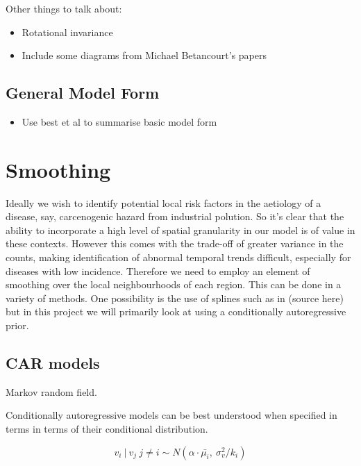 \documentclass{report}
\begin{document}
Other things to talk about:
\begin{itemize}

\item Rotational invariance

\item Include some diagrams from Michael Betancourt's papers

\end{itemize}

\subsection{General Model Form}

\begin{itemize}
\item Use best et al to summarise basic model form
\end{itemize}

\section{Smoothing}

Ideally we wish to identify potential local risk factors in the aetiology of a disease, say, carcenogenic hazard from industrial polution. So it's clear that the ability to incorporate a high level of spatial granularity in our model is of value in these contexts. However this comes with the trade-off of greater variance in the counts, making identification of abnormal temporal trends difficult, especially for diseases with low incidence. Therefore we need to employ an element of smoothing over the local neighbourhoods of each region. This can be done in a variety of methods. One possibility is the use of splines such as in (source here) but in this project we will primarily look at using a conditionally autoregressive prior.

\subsection{CAR models} \label{carmodel}

Markov random field.

Conditionally autoregressive models can be best understood when specified in terms in terms of their conditional distribution. 

\begin{equation}
v_i \ | \ v_j \ j \neq i \sim N(\alpha \cdot \bar{\mu_i}, \ \sigma_v^2/k_i)
\end{equation}
\end{document}
